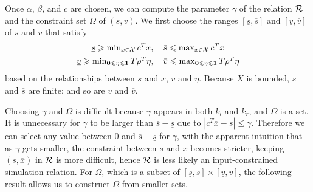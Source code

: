 Once $\alpha$, $\beta$, and $c$ are chosen, we can compute the parameter $\gamma$ of the relation $\mathcal{R}$ and the constraint set $\Omega$ of $(s,v)$.
We first choose the ranges $[\underline{s}, \overbar{s}]$ and $[\underline{v}, \overbar{v}]$ of $s$ and $v$ that satisfy
\begin{gather*}
  \underline{s} \geqslant \textstyle\min_{x \in \XSet} c^{T} x, \quad
  \overbar{s} \leqslant \max_{x \in \XSet} c^{T} x \\
  \underline{v} \geqslant \textstyle\min_{\Zero \leqslant \eta \leqslant \One} T \rho^{T} \eta, \quad
  \overbar{v} \leqslant \max_{\Zero \leqslant \eta \leqslant \One} T \rho^{T} \eta
\end{gather*}
based on the relationships between $s$ and $\overbar{x}$, $v$ and $\eta$.
Because $X$ is bounded, $\underline{s}$ and $\overbar{s}$ are finite; and so are $\underline{v}$ and $\overbar{v}$.

Choosing $\gamma$ and $\Omega$ is difficult because $\gamma$ appears in both $k_{l}$ and $k_{r}$, and $\Omega$ is a set.
It is unnecessary for $\gamma$ to be larger than $\overbar{s} - \underline{s}$ due to %
$| c^{T} \overbar{x} - s | \leqslant \gamma$.
Therefore we can select any value between $0$ and $\overbar{s} - \underline{s}$ for $\gamma$, with the apparent intuition that as $\gamma$ gets smaller, the constraint between $s$ and $\overbar{x}$ becomes stricter, keeping $(s, \overbar{x})$ in $\mathcal{R}$ is more difficult, hence $\mathcal{R}$ is less likely an input-constrained simulation relation.
For $\Omega$, which is a subset of $[\underline{s}, \overbar{s}] \times[\underline{v}, \overbar{v}]$, the following result allows us to construct $\Omega$ from smaller sets.

